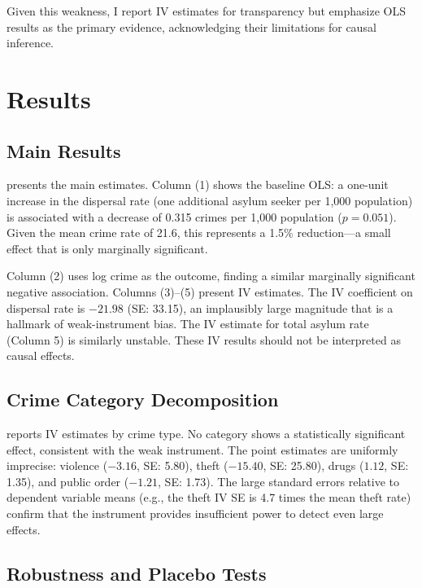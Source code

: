 \documentclass[12pt]{article}
\begin{document}
Given this weakness, I report IV estimates for transparency but emphasize OLS results as the primary evidence, acknowledging their limitations for causal inference.


\section{Results}

\subsection{Main Results}

 presents the main estimates. Column (1) shows the baseline OLS: a one-unit increase in the dispersal rate (one additional asylum seeker per 1,000 population) is associated with a decrease of 0.315 crimes per 1,000 population ($p = 0.051$). Given the mean crime rate of 21.6, this represents a 1.5\% reduction---a small effect that is only marginally significant.

Column (2) uses log crime as the outcome, finding a similar marginally significant negative association. Columns (3)--(5) present IV estimates. The IV coefficient on dispersal rate is $-21.98$ (SE: 33.15), an implausibly large magnitude that is a hallmark of weak-instrument bias. The IV estimate for total asylum rate (Column 5) is similarly unstable. These IV results should not be interpreted as causal effects.



\subsection{Crime Category Decomposition}

 reports IV estimates by crime type. No category shows a statistically significant effect, consistent with the weak instrument. The point estimates are uniformly imprecise: violence ($-3.16$, SE: 5.80), theft ($-15.40$, SE: 25.80), drugs ($1.12$, SE: 1.35), and public order ($-1.21$, SE: 1.73). The large standard errors relative to dependent variable means (e.g., the theft IV SE is 4.7 times the mean theft rate) confirm that the instrument provides insufficient power to detect even large effects.



\subsection{Robustness and Placebo Tests}
\end{document}
